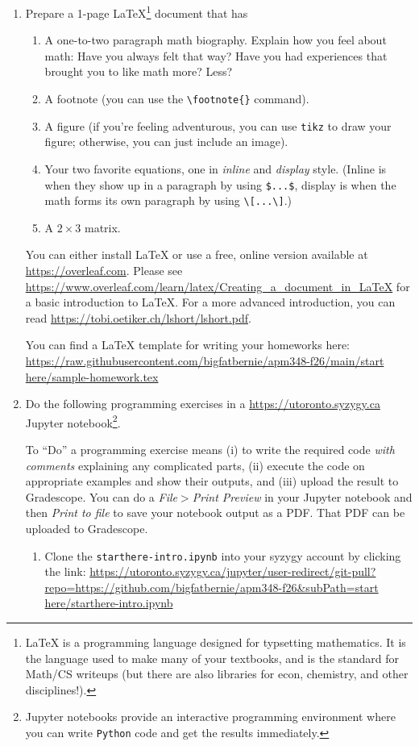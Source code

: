 \documentclass[letter]{article}
\begin{document}
	\begin{enumerate}
		\item Prepare a 1-page \LaTeX{}\footnote{ \LaTeX{} is a programming language designed for typsetting
			mathematics. It is the language used to make many of your textbooks, and is the standard for
			Math/CS writeups (but there are also libraries for econ, chemistry, and other disciplines!).} document that has
		\begin{enumerate}
			\item A one-to-two paragraph math biography. Explain how you feel about math: Have you always felt that way?
				Have you had experiences that brought you to like math more? Less?
			\item A footnote (you can use the \verb|\footnote{}| command).
			\item A figure (if you're feeling adventurous, you can use {\tt tikz} to draw your figure; otherwise,
				you can just include an image).
			\item Your two favorite equations, one in \emph{inline} and \emph{display} style. (Inline is when
				they show up in a paragraph by using \verb|$...$|, display is when the math forms
				its own paragraph by using \verb|\[...\]|.)
			\item A $2\times 3$ matrix.
		\end{enumerate}

		You can either install \LaTeX{} or use a free, online version available at \url{https://overleaf.com}. Please
		see \url{https://www.overleaf.com/learn/latex/Creating_a_document_in_LaTeX} for a basic introduction to \LaTeX{}.
		For a more advanced introduction, you can read \url{https://tobi.oetiker.ch/lshort/lshort.pdf}.

		You can find a \LaTeX{} template for writing your homeworks here: 
		\url{https://raw.githubusercontent.com/bigfatbernie/apm348-f26/main/start here/sample-homework.tex}



		\item Do the following programming exercises in a \url{https://utoronto.syzygy.ca} Jupyter notebook\footnote{ Jupyter
			notebooks provide an interactive programming environment where you can write {\tt Python} code and get 
			the results immediately.}.

			To ``Do'' a programming exercise means (i) to write the required code \emph{with comments} explaining
			any complicated parts, (ii) execute the code on appropriate examples and show their outputs, and 
			(iii) upload the result to Gradescope. You can do a {\it File$>$Print Preview} in your Jupyter notebook
			and then {\it Print to file} to save your notebook output as a PDF. That PDF can be uploaded to Gradescope.
		\begin{enumerate}
			\item Clone the {\tt starthere-intro.ipynb} into your syzygy account by clicking the link:
				\url{https://utoronto.syzygy.ca/jupyter/user-redirect/git-pull?repo=https://github.com/bigfatbernie/apm348-f26&subPath=start here/starthere-intro.ipynb}


\end{enumerate}
\end{enumerate}
\end{document}
